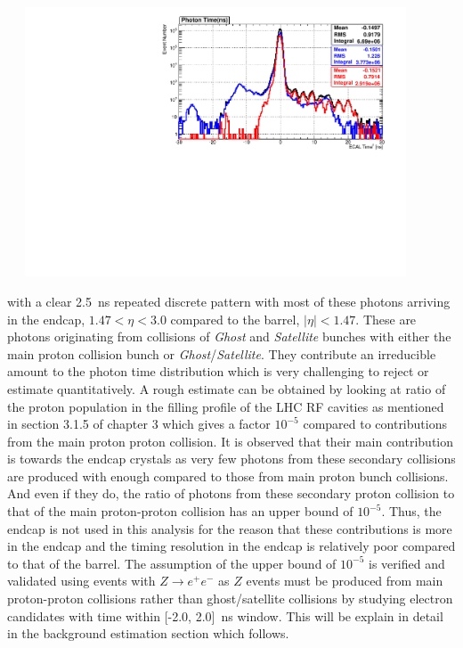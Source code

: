 \begin{center}
\centering
\mbox{
\includegraphics[height=8cm, width=0.9\textwidth]{THESISPLOTS/PhotonECALTimePtMTH50-C-D-SinglePhotonDataset.pdf}
}
\label{fig:TIMEECAL}
\end{center}

with a clear 2.5~ns repeated discrete pattern with most of these photons arriving in the endcap, $ 1.47 < \eta < 3.0$ compared to the barrel, $|\eta| < 1.47$. These are photons originating from collisions of \textit{Ghost} and \textit{Satellite} bunches with either the main proton collision bunch or \textit{Ghost}/\textit{Satellite}. They contribute an irreducible amount to the photon time distribution which is very challenging to reject or estimate quantitatively. A rough estimate can be obtained by looking at ratio of the proton population in the filling profile of the LHC RF cavities as mentioned in section 3.1.5 of chapter 3 which gives a factor $10^{-5}$ compared to contributions from the main proton proton collision. It is observed that their main contribution is towards the endcap crystals as very few photons from these secondary collisions are produced with enough \pt compared to those from main proton bunch collisions. And even if they do, the ratio of photons from these secondary proton collision to that of the main proton-proton collision has an upper bound of  $10^{-5}$. 
Thus, the endcap is not used in this analysis for the reason that these contributions is more in the endcap and the timing resolution in the endcap is relatively poor compared to that of the barrel.
The assumption of the upper bound of $10^{-5}$ is verified and validated using events with $Z\rightarrow e^{+}e^{-}$ as $Z$ events must be produced from main proton-proton collisions rather than  ghost/satellite collisions by studying electron candidates with time within [-2.0, 2.0]~ns window. This will be explain in detail in the background estimation section which follows.

